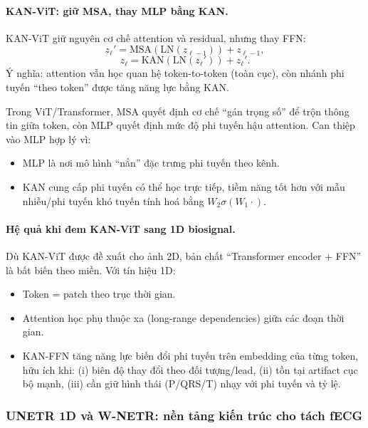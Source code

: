 \documentclass[../DoAn.tex]{subfiles}
\begin{document}
\paragraph{KAN-ViT: giữ MSA, thay MLP bằng KAN.}
\cite{yeElevatingVisionTransformer2024}
KAN-ViT giữ nguyên cơ chế attention và residual, nhưng thay FFN:
\begin{equation}
  z_\ell' = \mathrm{MSA}(\mathrm{LN}(z_{\ell-1})) + z_{\ell-1},
\end{equation}
\begin{equation}
  z_\ell = \mathrm{KAN}(\mathrm{LN}(z_\ell')) + z_\ell'.
\end{equation}
Ý nghĩa: attention vẫn học quan hệ token-to-token (toàn cục), còn nhánh phi tuyến ``theo token'' được tăng năng lực bằng KAN.

Trong ViT/Transformer, MSA quyết định cơ chế ``gán trọng số'' để trộn thông tin giữa token, còn MLP quyết định mức độ phi tuyến hậu attention.
Can thiệp vào MLP hợp lý vì:
\begin{itemize}
  \item MLP là nơi mô hình ``nắn'' đặc trưng phi tuyến theo kênh.
  \item KAN cung cấp phi tuyến có thể học trực tiếp, tiềm năng tốt hơn với mẫu nhiễu/phi tuyến khó tuyến tính hoá bằng $W_2\sigma(W_1\cdot)$.
\end{itemize}

\paragraph{Hệ quả khi đem KAN-ViT sang 1D biosignal.}
Dù KAN-ViT được đề xuất cho ảnh 2D, bản chất ``Transformer encoder + FFN'' là bất biến theo miền. Với tín hiệu 1D:
\begin{itemize}
  \item Token = patch theo trục thời gian.
  \item Attention học phụ thuộc xa (long-range dependencies) giữa các đoạn thời gian.
  \item KAN-FFN tăng năng lực biến đổi phi tuyến trên embedding của từng token, hữu ích khi:
    (i) biên độ thay đổi theo đối tượng/lead,
    (ii) tồn tại artifact cục bộ mạnh,
    (iii) cần giữ hình thái (P/QRS/T) nhạy với phi tuyến và tỷ lệ.
\end{itemize}

\subsubsection{UNETR 1D và W-NETR: nền tảng kiến trúc cho tách fECG}
\end{document}
